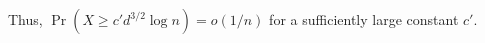 \documentclass{patmorin}
\begin{document}
Thus, $\Pr(X\ge c'd^{3/2}\log n) =o(1/n)$ for a sufficiently large constant $c'$.
%
%
\end{document}
